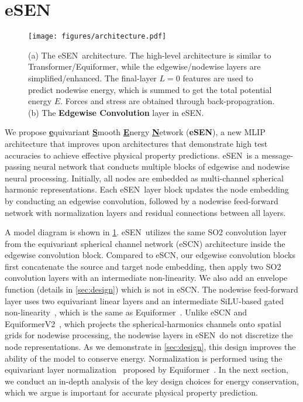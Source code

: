 \documentclass[twocolumn]{fairmeta}
\newcommand{\ourmodel}{eSEN}
\begin{document}
\section{\ourmodel}
\label{sec:model}

\begin{figure}[t]
\texttt{[image: figures/architecture.pdf]}
\caption{(a) The \ourmodel\ architecture. The high-level architecture is similar to Transformer/Equiformer, while the edgewise/nodewise layers are simplified/enhanced. The final-layer $L=0$ features are used to predict nodewise energy, which is summed to get the total potential energy $E$. Forces and stress are obtained through back-propagration. (b) The \textbf{Edgewise Convolution} layer in \ourmodel.
}
\label{fig:model}
\end{figure}

We propose \textbf{\underline{e}}quivariant \textbf{\underline{S}}mooth \textbf{\underline{E}}nergy \textbf{\underline{N}}etwork (\textbf{\ourmodel}), a new MLIP architecture that improves upon architectures that demonstrate high test accuracies to achieve effective physical property predictions. \ourmodel\ is a message-passing neural network that conducts multiple blocks of edgewise and nodewise neural processing. Initially, all nodes are embedded as multi-channel spherical harmonic representations. Each \ourmodel\ layer block updates the node embedding by conducting an edgewise convolution, followed by a nodewise feed-forward network with normalization layers and residual connections between all layers. 

A model diagram is shown in \cref{fig:model}. \ourmodel\ utilizes the same SO2 convolution layer from the equivariant spherical channel network (eSCN) architecture \cite{passaro2023reducing} inside the edgewise convolution block. Compared to eSCN, our edgewise convolution blocks first concatenate the source and target node embedding, then apply two SO2 convolution layers with an intermediate non-linearity. We also add an envelope function (details in \cref{sec:design}) which is not in eSCN. The nodewise feed-forward layer uses two equivariant linear layers and an intermediate SiLU-based gated non-linearity~\citep{weiler20183d, geiger2022e3nn}, which is the same as Equiformer~\citep{liao2022equiformer}. Unlike eSCN and EquiformerV2~\citep{liao2023equiformerv2}, which projects the spherical-harmonics channels onto spatial grids for nodewise processing, the nodewise layers in \ourmodel\ do not discretize the node representations. As we demonstrate in \cref{sec:design}, this design improves the ability of the model to conserve energy. Normalization is performed using the equivariant layer normalization~\citep{ba2016layer} proposed by Equiformer~\citep{liao2022equiformer}. In the next section, we conduct an in-depth analysis of the key design choices for energy conservation, which we argue is important for accurate physical property prediction.
\end{document}
